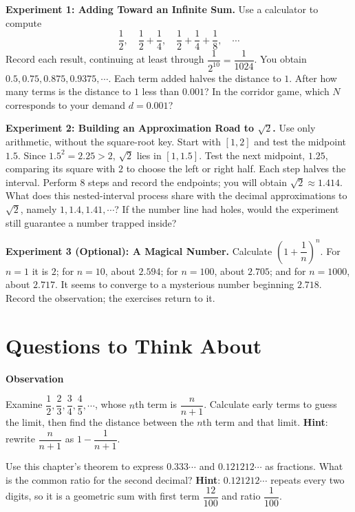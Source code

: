\begin{shiyan}
\textbf{Experiment 1: Adding Toward an Infinite Sum.} Use a calculator to compute
\[
\frac{1}{2},\quad \frac{1}{2}+\frac{1}{4},\quad \frac{1}{2}+\frac{1}{4}+\frac{1}{8},\quad \cdots
\]
Record each result, continuing at least through $\dfrac{1}{2^{10}}=\dfrac{1}{1024}$. You obtain $0.5,0.75,0.875,0.9375,\cdots$. Each term added halves the distance to $1$. After how many terms is the distance to $1$ less than $0.001$? In the corridor game, which $N$ corresponds to your demand $d=0.001$?

\textbf{Experiment 2: Building an Approximation Road to $\sqrt{2}$.} Use only arithmetic, without the square-root key. Start with $[1,2]$ and test the midpoint $1.5$. Since $1.5^2=2.25>2$, $\sqrt{2}$ lies in $[1,1.5]$. Test the next midpoint, $1.25$, comparing its square with $2$ to choose the left or right half. Each step halves the interval. Perform $8$ steps and record the endpoints; you will obtain $\sqrt{2}\approx 1.414$. What does this nested-interval process share with the decimal approximations to $\sqrt{2}$, namely $1,1.4,1.41,\cdots$? If the number line had holes, would the experiment still guarantee a number trapped inside?

\textbf{Experiment 3 (Optional): A Magical Number.} Calculate $\left(1+\dfrac{1}{n}\right)^n$. For $n=1$ it is $2$; for $n=10$, about $2.594$; for $n=100$, about $2.705$; and for $n=1000$, about $2.717$. It seems to converge to a mysterious number beginning $2.718$. Record the observation; the exercises return to it.
\end{shiyan}

\section*{Questions to Think About}

\textbf{Observation}
\begin{sikao}
  \item Examine $\dfrac{1}{2},\dfrac{2}{3},\dfrac{3}{4},\dfrac{4}{5},\cdots$, whose $n$th term is $\dfrac{n}{n+1}$. Calculate early terms to guess the limit, then find the distance between the $n$th term and that limit. \textbf{Hint}: rewrite $\dfrac{n}{n+1}$ as $1-\dfrac{1}{n+1}$.
  \item Use this chapter's theorem to express $0.333\cdots$ and $0.121212\cdots$ as fractions. What is the common ratio for the second decimal? \textbf{Hint}: $0.121212\cdots$ repeats every two digits, so it is a geometric sum with first term $\dfrac{12}{100}$ and ratio $\dfrac{1}{100}$.
\end{sikao}

